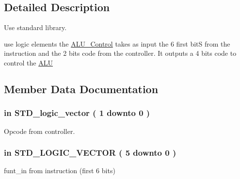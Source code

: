 \subsection{\-Detailed \-Description}
\-Use standard library. 

use logic elements the \hyperlink{class_a_l_u___control}{\-A\-L\-U\-\_\-\-Control} takes as input the 6 first bit\-S from the instruction and the 2 bits code from the controller. \-It outputs a 4 bits code to control the \hyperlink{class_a_l_u}{\-A\-L\-U} 

\subsection{\-Member \-Data \-Documentation}
\hypertarget{class_a_l_u___control_ab5e38318e201e0011dc9fe806b2c9ea4}{
\subsubsection[{\-A\-L\-U\-\_\-\-O\-P}]{ {\bfseries in } {\bfseries \-S\-T\-D\-\_\-logic\-\_\-vector (   1    downto    0  ) } }}\label{class_a_l_u___control_ab5e38318e201e0011dc9fe806b2c9ea4}


\-Opcode from controller. 

\hypertarget{class_a_l_u___control_aa057cc5bea77eab736c8c526429fa204}{
\subsubsection[{\-A\-L\-U\-\_\-\-Funct\-\_\-\-In}]{ {\bfseries in } {\bfseries \-S\-T\-D\-\_\-\-L\-O\-G\-I\-C\-\_\-\-V\-E\-C\-T\-O\-R (   5    downto    0  ) } }}\label{class_a_l_u___control_aa057cc5bea77eab736c8c526429fa204}


funt\-\_\-in from instruction (first 6 bits) 

